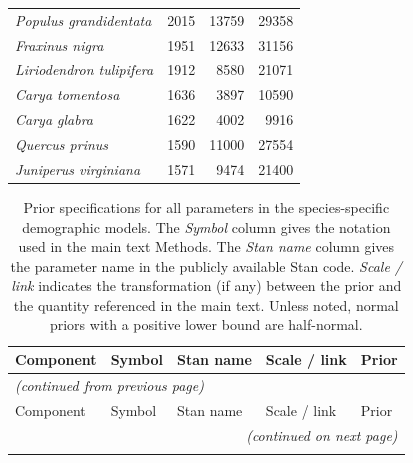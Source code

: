 {\begin{longtable}{lrrr}
    \emph{Populus grandidentata} & 2015 & 13759 & 29358 \\
    \emph{Fraxinus nigra} & 1951 & 12633 & 31156 \\
    \emph{Liriodendron tulipifera} & 1912 & 8580 & 21071 \\
    \emph{Carya tomentosa} & 1636 & 3897 & 10590 \\
    \emph{Carya glabra} & 1622 & 4002 & 9916 \\
    \emph{Quercus prinus} & 1590 & 11000 & 27554 \\
    \emph{Juniperus virginiana} & 1571 & 9474 & 21400 \\
  \bottomrule
\end{longtable}
}

\newpage

\begin{longtable}{@{}p{2.1cm} p{2.1cm} p{2.1cm} p{4.3cm} p{3.6cm}@{}}
\caption{Prior specifications for all parameters in the species-specific
demographic models. The \emph{Symbol} column gives the notation used in the
main text Methods. The \emph{Stan name} column gives the parameter name in
the publicly available Stan code. \emph{Scale / link} indicates the
transformation (if any) between the prior and the quantity referenced in the
main text. Unless noted, normal priors with a positive lower bound are
half-normal.}\label{tab:priors}\\
\toprule
Component & Symbol & Stan name & Scale / link & Prior \\
\midrule
\endfirsthead
\multicolumn{5}{l}{\textit{(continued from previous page)}}\\
\toprule
Component & Symbol & Stan name & Scale / link & Prior \\
\midrule
\endhead
\midrule
\multicolumn{5}{r}{\textit{(continued on next page)}}\\
\endfoot
\bottomrule
\endlastfoot


\end{longtable}
